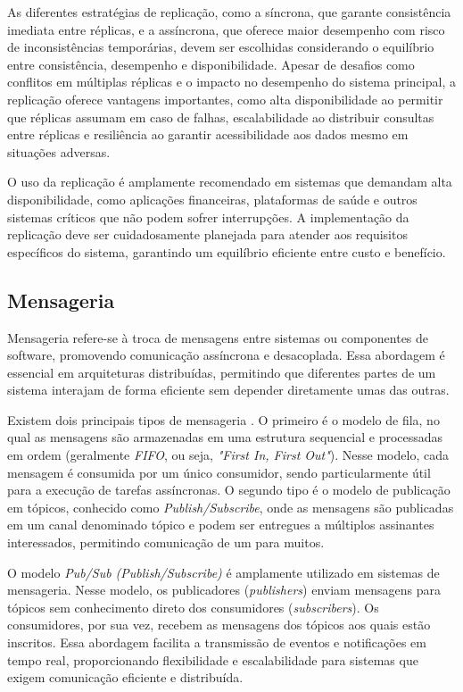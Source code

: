 As diferentes estratégias de replicação, como a síncrona, que garante consistência imediata entre réplicas, e a assíncrona, que oferece maior desempenho com risco de inconsistências temporárias, devem ser escolhidas considerando o equilíbrio entre consistência, desempenho e disponibilidade. Apesar de desafios como conflitos em múltiplas réplicas e o impacto no desempenho do sistema principal, a replicação oferece vantagens importantes, como alta disponibilidade ao permitir que réplicas assumam em caso de falhas, escalabilidade ao distribuir consultas entre réplicas e resiliência ao garantir acessibilidade aos dados mesmo em situações adversas.

O uso da replicação é amplamente recomendado em sistemas que demandam alta disponibilidade, como aplicações financeiras, plataformas de saúde e outros sistemas críticos que não podem sofrer interrupções. A implementação da replicação deve ser cuidadosamente planejada para atender aos requisitos específicos do sistema, garantindo um equilíbrio eficiente entre custo e benefício.


\subsection{Mensageria}


Mensageria refere-se à troca de mensagens entre sistemas ou componentes de software, promovendo comunicação assíncrona e desacoplada. Essa abordagem é essencial em arquiteturas distribuídas, permitindo que diferentes partes de um sistema interajam de forma eficiente sem depender diretamente umas das outras.

Existem dois principais tipos de mensageria \cite{what-is-message-broker}. O primeiro é o modelo de fila, no qual as mensagens são armazenadas em uma estrutura sequencial e processadas em ordem (geralmente \emph{FIFO}, ou seja, \emph{"First In, First Out"}). Nesse modelo, cada mensagem é consumida por um único consumidor, sendo particularmente útil para a execução de tarefas assíncronas. O segundo tipo é o modelo de publicação em tópicos, conhecido como \emph{Publish/Subscribe}, onde as mensagens são publicadas em um canal denominado tópico e podem ser entregues a múltiplos assinantes interessados, permitindo comunicação de um para muitos.

O modelo \emph{Pub/Sub (Publish/Subscribe)} é amplamente utilizado em sistemas de mensageria. Nesse modelo, os publicadores (\emph{publishers}) enviam mensagens para tópicos sem conhecimento direto dos consumidores (\emph{subscribers}). Os consumidores, por sua vez, recebem as mensagens dos tópicos aos quais estão inscritos. Essa abordagem facilita a transmissão de eventos e notificações em tempo real, proporcionando flexibilidade e escalabilidade para sistemas que exigem comunicação eficiente e distribuída.

